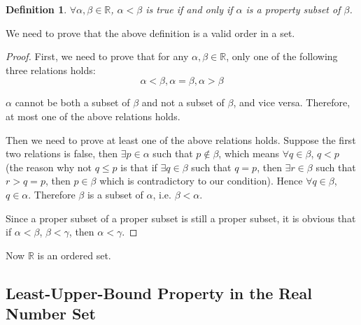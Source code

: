 \documentclass[onecolumn]{article}
\newtheorem{definition}{Definition}[section]
\begin{document}
\begin{definition}
  $\forall \alpha, \beta \in \mathbb{R}$, $\alpha < \beta$ is true if and only 
  if $\alpha$ is a property subset of $\beta$.
\end{definition}
We need to prove that the above definition is a valid order in a set.
\begin{proof}
  First, we need to prove that for any $\alpha, \beta \in \mathbb{R}$, only one 
  of the following three relations holds:
  \[
    \alpha < \beta, \alpha = \beta, \alpha > \beta
  \]

  $\alpha$ cannot be both a subset of $\beta$ and not a subset of $\beta$, and 
  vice versa. Therefore, at most one of the above relations holds.

  Then we need to prove at least one of the above relations holds. Suppose the 
  first two relations is false, then $\exists p \in \alpha$ such that 
  $p \notin \beta$, which means $\forall q \in \beta$, $q < p$ (the reason why 
  not $q \leq p$ is that if $\exists q \in \beta$ such that $q = p$, then 
  $\exists r \in \beta$ such that $r > q = p$, then $p \in \beta$ which is 
  contradictory to our condition). Hence $\forall q \in \beta$, $q \in \alpha$. 
  Therefore $\beta$ is a subset of $\alpha$, i.e. $\beta < \alpha$.

  Since a proper subset of a proper subset is still a proper subset, it is 
  obvious that if $\alpha < \beta$, $\beta < \gamma$, then $\alpha < \gamma$.
\end{proof}

Now $\mathbb{R}$ is an ordered set.

\subsection{Least-Upper-Bound Property in the Real Number Set}
\end{document}
